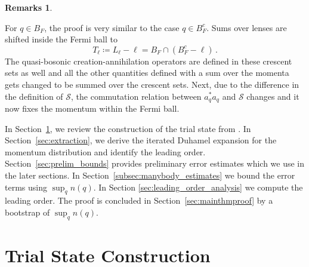 \documentclass[12pt,a4paper]{article}
\numberwithin{equation}{section}
\newcommand{\1}{\mathbb{I}}
\theoremstyle{plain}
\theoremstyle{definition}
\newtheorem*{remarks}{Remarks}
\theoremstyle{remark}
\theoremstyle{plain}
\theoremstyle{definition}
\theoremstyle{remark}
\begin{document}
\begin{remarks}
\begin{enumerate}
For $q \in B_F$, the proof is very similar to the case $q \in B_F^c$. Sums over lenses are shifted inside the Fermi ball to
\begin{equation}
	T_\ell \coloneq L_\ell -\ell = B_F \cap (B_F^c-\ell)\,.
\end{equation}
The quasi-bosonic creation-annihilation operators are defined in these crescent sets as well and all the other quantities defined with a sum over the momenta gets changed to be summed over the crescent sets.
Next, due to the difference in the definition of $\mathcal{S}$, the commutation relation between $a^*_qa_q$ and $\mathcal{S}$ changes and it now fixes the momentum within the Fermi ball.
\end{enumerate}
\end{remarks}

In Section~\ref{sec:trialstate}, we review the construction of the trial state from \cite{CHN23}. In Section~\ref{sec:extraction}, we derive the iterated Duhamel expansion for the momentum distribution and identify the leading order. Section~\ref{sec:prelim_bounds} provides preliminary error estimates which we use in the later sections. In Section~\ref{subsec:manybody_estimates} we bound the error terms using $\sup_q n(q)$. In Section \ref{sec:leading_order_analysis} we compute the leading order. The proof is concluded in Section~\ref{sec:mainthmproof} by a bootstrap of $\sup_q n(q)$.





\section{Trial State Construction}
\label{sec:trialstate}
\end{document}
